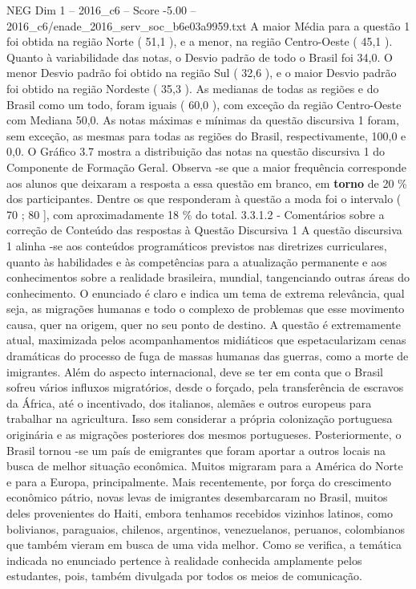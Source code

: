 \begin{textsample}{NEG Dim 1 – 2016\_c6 – Score -5.00 – 2016\_c6/enade\_2016\_serv\_soc\_b6e03a9959.txt}
A maior Média para a questão 1 foi obtida na região Norte ( 51,1 ), e a menor, na região Centro-Oeste ( 45,1 ).
Quanto à variabilidade das notas, o Desvio padrão de todo o Brasil foi 34,0.
O menor Desvio padrão foi obtido na região Sul ( 32,6 ), e o maior Desvio padrão foi obtido na região Nordeste ( 35,3 ).
As medianas de todas as regiões e do Brasil como um todo, foram iguais ( 60,0 ), com exceção da região Centro-Oeste com Mediana 50,0.
As notas máximas e mínimas da questão discursiva 1 foram, sem exceção, as mesmas para todas as regiões do Brasil, respectivamente, 100,0 e 0,0.
O Gráfico 3.7 mostra a distribuição das notas na questão discursiva 1 do Componente de Formação Geral.
Observa -se que a maior frequência corresponde aos alunos que deixaram a resposta a essa questão em branco, em \textbf{torno} de 20 \% dos participantes.
Dentre os que responderam à questão a moda foi o intervalo ( 70 ; 80 ], com aproximadamente 18 \% do total. 3.3.1.2 - Comentários sobre a correção de Conteúdo das respostas à Questão Discursiva 1 A questão discursiva 1 alinha -se aos conteúdos programáticos previstos nas diretrizes curriculares, quanto às habilidades e às competências para a atualização permanente e aos conhecimentos sobre a realidade brasileira, mundial, tangenciando outras áreas do conhecimento.
O enunciado é claro e indica um tema de extrema relevância, qual seja, as migrações humanas e todo o complexo de problemas que esse movimento causa, quer na origem, quer no seu ponto de destino.
A questão é extremamente atual, maximizada pelos acompanhamentos midiáticos que espetacularizam cenas dramáticas do processo de fuga de massas humanas das guerras, como a morte de imigrantes.
Além do aspecto internacional, deve se ter em conta que o Brasil sofreu vários influxos migratórios, desde o forçado, pela transferência de escravos da África, até o incentivado, dos italianos, alemães e outros europeus para trabalhar na agricultura.
Isso sem considerar a própria colonização portuguesa originária e as migrações posteriores dos mesmos portugueses.
Posteriormente, o Brasil tornou -se um país de emigrantes que foram aportar a outros locais na busca de melhor situação econômica.
Muitos migraram para a América do Norte e para a Europa, principalmente.
Mais recentemente, por força do crescimento econômico pátrio, novas levas de imigrantes desembarcaram no Brasil, muitos deles provenientes do Haiti, embora tenhamos recebidos vizinhos latinos, como bolivianos, paraguaios, chilenos, argentinos, venezuelanos, peruanos, colombianos que também vieram em busca de uma vida melhor.
Como se verifica, a temática indicada no enunciado pertence à realidade conhecida amplamente pelos estudantes, pois, também divulgada por todos os meios de comunicação.

\end{textsample}
